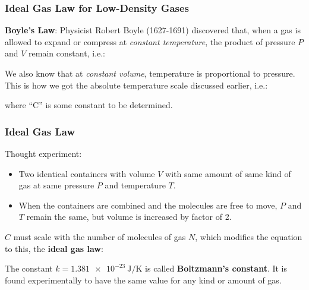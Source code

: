 \documentclass[12pt,aspectratio=169]{beamer}
\newcommand{\eq}[2]{\vspace{#1}{\Large\begin{displaymath}#2\end{displaymath}}}
\begin{document}
\begin{frame}
  \frametitle{Ideal Gas Law for Low-Density Gases}

  \textbf{Boyle's Law}: Physicist Robert Boyle (1627-1691) discovered that,
  when a gas is allowed to expand or compress at \emph{constant temperature},
  the product of pressure $P$ and $V$ remain constant, i.e.:

  \eq{-.2in}{
    PV=\textrm{constant} %
  }

  \vspace{-.1in}We also know that at \emph{constant volume}, temperature is
  proportional to pressure. This is how we got the absolute temperature scale
  discussed earlier, i.e.:

  \eq{-.3in}{
    PV=CT
  }

  \vspace{-.2in}where ``C'' is some constant to be determined.
\end{frame}


\begin{frame}
  \frametitle{Ideal Gas Law}
  Thought experiment:
  \begin{itemize}
  \item Two identical containers with volume $V$ with same amount of same kind
    of gas at same pressure $P$ and temperature $T$.
  \item When the containers are combined and the molecules are free to
    move, $P$ and $T$ remain the same, but volume is increased by factor of 2.
  \end{itemize}

  $C$ must scale with the number of molecules of gas $N$, which modifies the
  equation to this, the \textbf{ideal gas law}:

  \eq{-.25in}{
    \boxed{PV=NkT}
  }

  \vspace{-.15in}The constant $k=\SI{1.381e-23}{\joule/\kelvin}$ is called
  \textbf{Boltzmann's constant}. It is found experimentally to have the same
  value for any kind or amount of gas.
\end{frame}
\end{document}
